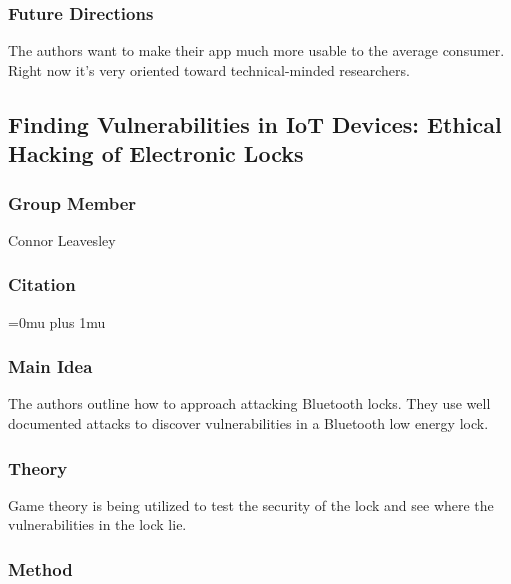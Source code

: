 \subsubsection{Future Directions}

\noindent
The authors want to make their app much more usable to the average consumer.  Right now it's very oriented toward technical-minded researchers.

\subsection[Finding Vulnerabilities in IoT Devices: Ethical Hacking of Electronic Locks]{Finding Vulnerabilities in IoT Devices: Ethical \\Hacking of Electronic Locks}

\subsubsection{Group Member}

\noindent
Connor Leavesley

\noindent
\subsubsection{Citation}

\Urlmuskip=0mu plus 1mu\relax
{}

\subsubsection{Main Idea}

\noindent
The authors outline how to approach attacking Bluetooth locks. They use well documented attacks to discover vulnerabilities in a Bluetooth low energy lock.

\subsubsection{Theory}

\noindent
Game theory is being utilized to test the security of the lock and see where the vulnerabilities in the lock lie. 

\subsubsection{Method}


